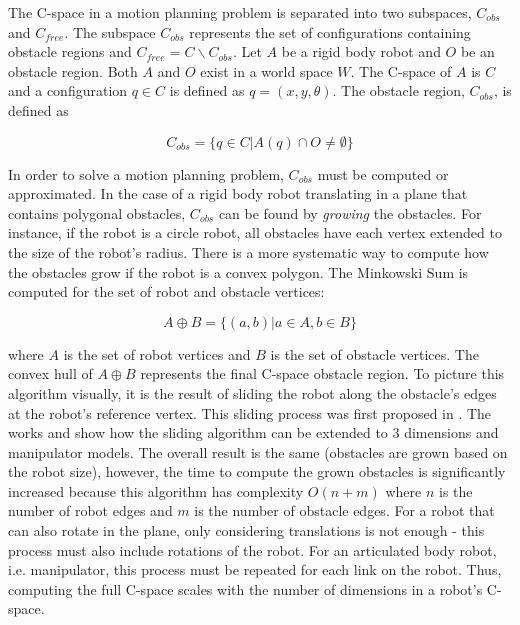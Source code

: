 \documentclass[10pt,conference]{ieeeconf}
\begin{document}
    The C-space in a motion planning problem is separated into two subspaces, $C_{obs}$ and $C_{free}$. The subspace $C_{obs}$ represents the set of configurations containing obstacle regions and $C_{free} = C \backslash C_{obs}$. Let $A$ be a rigid body robot and $O$ be an obstacle region. Both $A$ and $O$ exist in a world space $W$. The C-space of $A$ is $C$ and a configuration $q \in C$ is defined as $q=(x, y, \theta)$. The obstacle region, $C_{obs}$, is defined as
    
    \begin{equation}
    C_{obs} = \{q \in C | A(q) \cap O \neq \emptyset\}
    \end{equation}

In order to solve a motion planning problem, $C_{obs}$ must be computed or approximated. In the case of a rigid body robot translating in a plane that contains polygonal obstacles, $C_{obs}$ can be found by \emph{growing} the obstacles. For instance, if the robot is a circle robot, all obstacles have each vertex extended to the size of the robot's radius. There is a more systematic way to compute how the obstacles grow if the robot is a convex polygon. The Minkowski Sum is computed for the set of robot and obstacle vertices:

\begin{equation}
A \oplus B = \{(a,b) | a \in A, b \in B\}
\end{equation}

where $A$ is the set of robot vertices and $B$ is the set of obstacle vertices. The convex hull of $A \oplus B$ represents the final C-space obstacle region. To picture this algorithm visually, it is the result of sliding the robot along the obstacle's edges at the robot's reference vertex. This sliding process was first proposed in \cite{lozano1979algorithm}. The works \cite{lozano1981automatic} and \cite{lozano1983spatial} show how the sliding algorithm can be extended to 3 dimensions and manipulator models. The overall result is the same (obstacles are grown based on the robot size), however, the time to compute the grown obstacles is significantly increased because this algorithm has complexity $O(n+m)$ where $n$ is the number of robot edges and $m$ is the number of obstacle edges. For a robot that can also rotate in the plane, only considering translations is not enough - this process must also include rotations of the robot. For an articulated body robot, i.e. manipulator, this process must be repeated for each link on the robot. Thus, computing the full C-space scales with the number of dimensions in a robot's C-space.
\end{document}
